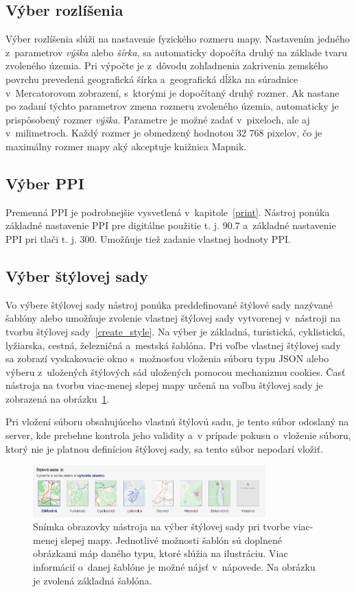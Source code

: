 \subsection*{Výber rozlíšenia}
Výber rozlíšenia slúži na nastavenie fyzického rozmeru mapy. Nastavením jedného z~parametrov {\it výška} alebo {\it šírka}, sa automaticky dopočíta druhý na základe tvaru zvoleného územia. Pri výpočte je z~dôvodu zohľadnenia zakrivenia zemského povrchu prevedená geografická šírka a~geografická dĺžka na súradnice v~Mercatorovom zobrazení, s~ktorými je dopočítaný druhý rozmer. Ak nastane po zadaní týchto parametrov zmena rozmeru zvoleného územia, automaticky je prispôsobený rozmer {\it výška}. 
Parametre je možné zadať v~pixeloch, ale aj v~milimetroch. Každý rozmer je obmedzený hodnotou 32 768 pixelov, čo je maximálny rozmer mapy aký akceptuje knižnica Mapnik.

\subsection*{Výber PPI}
Premenná PPI je podrobnejšie vysvetlená v~kapitole~\ref{print}. Nástroj ponúka základné nastavenie PPI pre digitálne použitie t. j. 90.7 a~základné nastavenie PPI pri tlači t. j. 300. Umožňuje tiež zadanie vlastnej hodnoty PPI.

\subsection*{Výber štýlovej sady}
Vo výbere štýlovej sady nástroj ponúka preddefinované štýlové sady nazývané šablóny alebo umožňuje zvolenie vlastnej štýlovej sady vytvorenej v~nástroji na tvorbu štýlovej sady~\ref{create_style}. Na výber je základná, turistická, cyklistická, lyžiarska, cestná, železničná a~mestská šablóna. Pri voľbe vlastnej štýlovej sady sa zobrazí vyskakovacie okno s~možnosťou vloženia súboru typu JSON alebo výberu z~uložených štýlových sád uložených pomocou mechanizmu cookies. Časť nástroja na tvorbu viac-menej slepej mapy určená na voľbu štýlovej sady je zobrazená na obrázku~\ref{img_select_style}.

Pri vložení súboru obsahujúceho vlastnú štýlovú sadu, je tento súbor odoslaný na server, kde prebehne kontrola jeho validity a~v prípade pokusu o~vloženie súboru, ktorý nie je platnou definíciou štýlovej sady, sa tento súbor nepodarí vložiť.

\begin{figure}[hbt]
	\centering
	\includegraphics[width=0.8\textwidth]{obrazky-figures/img_select_style.png}
	\caption{Snímka obrazovky nástroja na výber štýlovej sady pri tvorbe viac-menej slepej mapy. Jednotlivé možnosti šablón sú doplnené obrázkami máp daného typu, ktoré slúžia na ilustráciu. Viac informácií o~danej šablóne je možné nájsť v~nápovede. Na obrázku je zvolená základná šablóna.}
	\label{img_select_style}
\end{figure}

